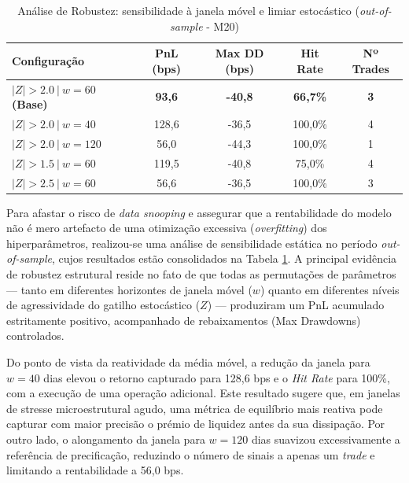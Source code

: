 \documentclass[fleqn]{rbfin}
\begin{document}

\begin{table}[H]
\centering
\caption{Análise de Robustez: sensibilidade à janela móvel e limiar estocástico (\textit{out-of-sample} - M20)}
\label{tab:robustez}
\begin{tabular}{lcccc}
\toprule
\textbf{Configuração}                  & \textbf{PnL (bps)} & \textbf{Max DD (bps)} & \textbf{Hit Rate} & \textbf{Nº Trades} \\ 
\midrule
\textbf{$|Z| > 2.0 \ | \ w=60$ (Base)} & \textbf{93,6}      & \textbf{-40,8}        & \textbf{66,7\%}   & \textbf{3}         \\
$|Z| > 2.0 \ | \ w=40$                 & 128,6              & -36,5                 & 100,0\%           & 4                  \\
$|Z| > 2.0 \ | \ w=120$                & 56,0               & -44,3                 & 100,0\%           & 1                  \\
$|Z| > 1.5 \ | \ w=60$                 & 119,5              & -40,8                 & 75,0\%            & 4                  \\
$|Z| > 2.5 \ | \ w=60$                 & 56,6               & -36,5                 & 100,0\%           & 3                  \\ 
\bottomrule
\end{tabular}
\end{table}

Para afastar o risco de \textit{data snooping} e assegurar que a rentabilidade do modelo não é mero artefacto de uma otimização excessiva (\textit{overfitting}) dos hiperparâmetros, realizou-se uma análise de sensibilidade estática no período \textit{out-of-sample}, cujos resultados estão consolidados na Tabela \ref{tab:robustez}. A principal evidência de robustez estrutural reside no fato de que todas as permutações de parâmetros — tanto em diferentes horizontes de janela móvel ($w$) quanto em diferentes níveis de agressividade do gatilho estocástico ($Z$) — produziram um PnL acumulado estritamente positivo, acompanhado de rebaixamentos (Max Drawdowns) controlados.

Do ponto de vista da reatividade da média móvel, a redução da janela para $w=40$ dias elevou o retorno capturado para 128,6 bps e o \textit{Hit Rate} para 100\%, com a execução de uma operação adicional. Este resultado sugere que, em janelas de stresse microestrutural agudo, uma métrica de equilíbrio mais reativa pode capturar com maior precisão o prémio de liquidez antes da sua dissipação. Por outro lado, o alongamento da janela para $w=120$ dias suavizou excessivamente a referência de precificação, reduzindo o número de sinais a apenas um \textit{trade} e limitando a rentabilidade a 56,0 bps.
\end{document}
